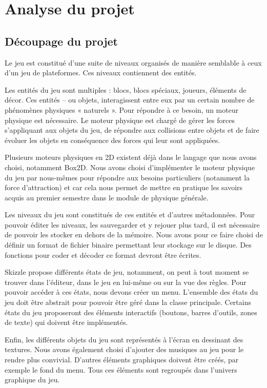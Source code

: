 \chapter{Analyse du projet}

\section{Découpage du projet}

Le jeu est constitué d'une suite de niveaux organisés de manière
semblable à ceux d'un jeu de plateformes. Ces niveaux contiennent des entités.

Les entités du jeu sont multiples : blocs, blocs spéciaux, joueurs,
éléments de décor. Ces entités -- ou objets, interagissent entre eux
par un certain nombre de phénomènes physiques « naturels ». Pour répondre
à ce besoin, un moteur physique est nécessaire. Le moteur physique est
chargé de gérer les forces s'appliquant aux objets du jeu, de répondre
aux collisions entre objets et de faire évoluer les objets en conséquence
des forces qui leur sont appliquées.

Plusieurs moteurs physiques en 2D existent déjà dans le langage que nous
avons choisi, notamment Box2D. Nous avons choisi d'implémenter le moteur
physique du jeu par nous-mêmes pour répondre aux besoins particuliers
(notamment la force d'attraction) et car cela nous permet de mettre en
pratique les savoirs acquis au premier semestre dans le module
de physique générale.

Les niveaux du jeu sont constitués de ces entités et d'autres
métadonnées. Pour pouvoir éditer les niveaux, les sauvegarder et
y rejouer plus tard, il est nécessaire de pouvoir les stocker
en dehors de la mémoire. Nous avons pour ce faire choisi de définir
un format de fichier binaire permettant leur stockage sur le disque.
Des fonctions pour coder et décoder ce format devront être écrites.

Skizzle propose différents états de jeu, notamment, on peut à tout moment
se trouver dans l'éditeur, dans le jeu en lui-même ou sur la vue des règles.
Pour pouvoir accéder à ces états, nous devons créer un menu. L'ensemble
des états du jeu doit être abstrait pour pouvoir être géré dans la classe
principale. Certains états du jeu proposeront des éléments interactifs
(boutons, barres d'outils, zones de texte) qui doivent être implémentés.

Enfin, les différents objets du jeu sont représentés à l'écran en
dessinant des textures. Nous avons également choisi d'ajouter des musiques
au jeu pour le rendre plus convivial. D'autres éléments graphiques doivent
être créés, par exemple le fond du menu. Tous ces éléments sont regroupés
dans l'univers graphique du jeu.

